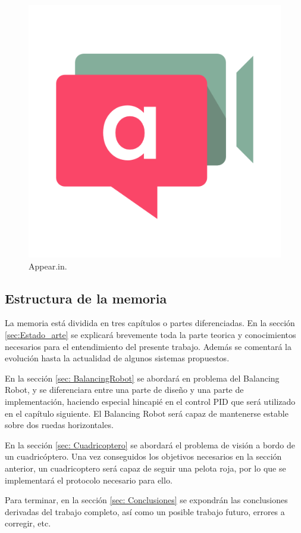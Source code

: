 \begin{figure}[H]
	\center
	\includegraphics[trim = 0mm 0mm 0mm 0mm, clip,scale=0.3]{imagenes/Introduction/appear}
	\caption{Appear.in.}
	\label{fig:appear}
\end{figure}

\subsection{Estructura de la memoria}

La memoria está dividida en tres capítulos o partes diferenciadas. \newline
En la sección \ref{sec:Estado_arte} se explicará brevemente toda la parte teorica y conocimientos necesarios para el entendimiento del presente trabajo. Además se comentará la evolución hasta la actualidad de algunos sistemas propuestos.\newline

En la sección \ref{sec: BalancingRobot} se abordará en problema del Balancing Robot, y se diferenciara entre una parte de diseño y una parte de implementación, haciendo especial hincapié en el control PID que será utilizado en el capítulo siguiente. El Balancing Robot será capaz de mantenerse estable sobre dos ruedas horizontales.\newline

En la sección \ref{sec: Cuadricoptero} se abordará el problema de visión a bordo de un cuadricóptero. 
Una vez conseguidos los objetivos necesarios en la sección anterior, un cuadricoptero será capaz de seguir una pelota roja, por lo que se implementará el protocolo necesario para ello. \newline

Para terminar, en la sección \ref{sec: Conclusiones} se expondrán las conclusiones derivadas del trabajo completo, así como un posible trabajo futuro, errores a corregir, etc.   